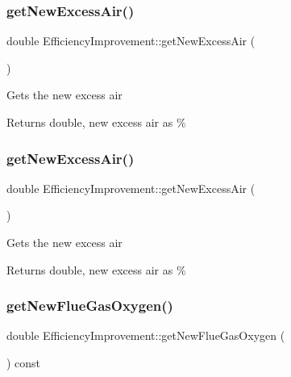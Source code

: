 \subsubsection{\texorpdfstring{get\+New\+Excess\+Air()}{getNewExcessAir()}\hspace{0.1cm}{\footnotesize\ttfamily [2/3]}}
{\footnotesize\ttfamily double Efficiency\+Improvement\+::get\+New\+Excess\+Air (\begin{DoxyParamCaption}{ }\end{DoxyParamCaption})}

Gets the new excess air

\begin{DoxyReturn}{Returns}
double, new excess air as \% 
\end{DoxyReturn}
\mbox{\label{class_efficiency_improvement_afda194c72ccc7332ba4331f87f971b77}} 
\subsubsection{\texorpdfstring{get\+New\+Excess\+Air()}{getNewExcessAir()}\hspace{0.1cm}{\footnotesize\ttfamily [3/3]}}
{\footnotesize\ttfamily double Efficiency\+Improvement\+::get\+New\+Excess\+Air (\begin{DoxyParamCaption}{ }\end{DoxyParamCaption})}

Gets the new excess air

\begin{DoxyReturn}{Returns}
double, new excess air as \% 
\end{DoxyReturn}
\mbox{\label{class_efficiency_improvement_a46dbfa28b53f36de80dd730c07b294f1}} 
\subsubsection{\texorpdfstring{get\+New\+Flue\+Gas\+Oxygen()}{getNewFlueGasOxygen()}\hspace{0.1cm}{\footnotesize\ttfamily [1/3]}}
{\footnotesize\ttfamily double Efficiency\+Improvement\+::get\+New\+Flue\+Gas\+Oxygen (\begin{DoxyParamCaption}{ }\end{DoxyParamCaption}) const\hspace{0.3cm}{\ttfamily [inline]}}


